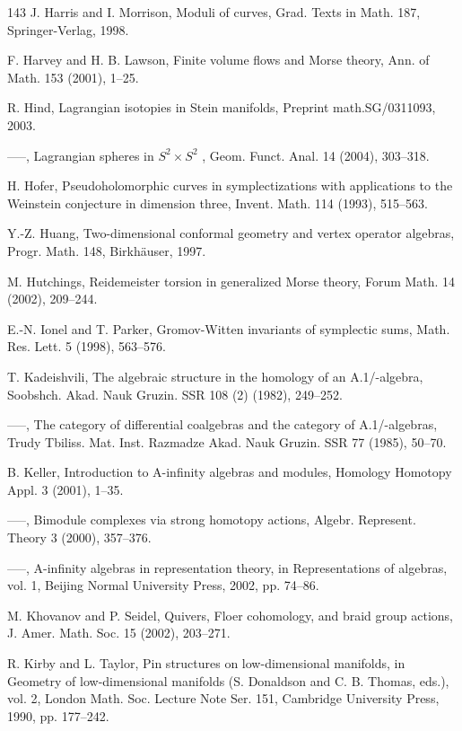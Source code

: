 \begin{thebibliography}{143}
 J. Harris and I. Morrison, Moduli of curves, Grad. Texts in Math. 187, Springer-Verlag, 1998.

 F. Harvey and H. B. Lawson, Finite volume flows and Morse theory, Ann. of Math. 153 (2001), 1–25.

 R. Hind, Lagrangian isotopies in Stein manifolds, Preprint math.SG/0311093, 2003.

 —–, Lagrangian spheres in \(S^2\times S^2\) , Geom. Funct. Anal. 14 (2004), 303–318.

 H. Hofer, Pseudoholomorphic curves in symplectizations with applications to the Weinstein conjecture in dimension three, Invent. Math. 114 (1993), 515–563.

 Y.-Z. Huang, Two-dimensional conformal geometry and vertex operator algebras, Progr. Math. 148, Birkhäuser, 1997.

 M. Hutchings, Reidemeister torsion in generalized Morse theory, Forum Math. 14 (2002), 209–244.

 E.-N. Ionel and T. Parker, Gromov-Witten invariants of symplectic sums, Math. Res. Lett. 5 (1998), 563–576.

 T. Kadeishvili, The algebraic structure in the homology of an A.1/-algebra, Soobshch. Akad. Nauk Gruzin. SSR 108 (2) (1982), 249–252.

 —–, The category of differential coalgebras and the category of A.1/-algebras, Trudy Tbiliss. Mat. Inst. Razmadze Akad. Nauk Gruzin. SSR 77 (1985), 50–70.

 B. Keller, Introduction to A-infinity algebras and modules, Homology Homotopy Appl. 3 (2001), 1–35.

 —–, Bimodule complexes via strong homotopy actions, Algebr. Represent. Theory 3 (2000), 357–376.

 —–, A-infinity algebras in representation theory, in Representations of algebras, vol. 1, Beijing Normal University Press, 2002, pp. 74–86.

 M. Khovanov and P. Seidel, Quivers, Floer cohomology, and braid group actions, J. Amer. Math. Soc. 15 (2002), 203–271.

 R. Kirby and L. Taylor, Pin structures on low-dimensional manifolds, in Geometry of low-dimensional manifolds (S. Donaldson and C. B. Thomas, eds.), vol. 2, London Math. Soc. Lecture Note Ser. 151, Cambridge University Press, 1990, pp. 177–242.


\end{thebibliography}
